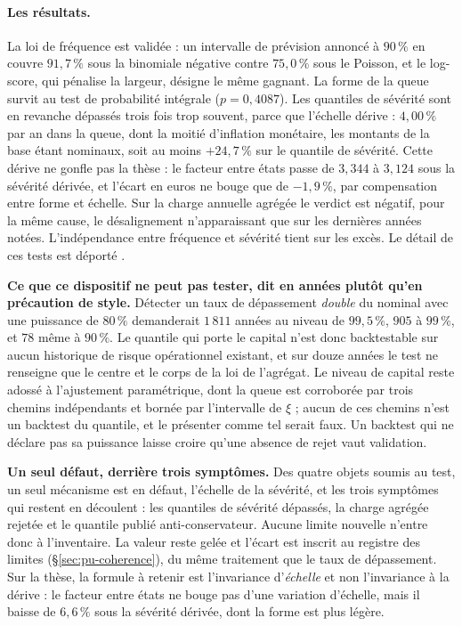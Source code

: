 \paragraph{Les résultats.} La loi de fréquence est validée : un intervalle de prévision annoncé à
$90\,\%$ en couvre $91{,}7\,\%$ sous la binomiale négative contre $75{,}0\,\%$ sous le Poisson,
et le log-score, qui pénalise la largeur, désigne le même gagnant. La forme de la queue survit au
test de probabilité intégrale ($p=0{,}4087$). Les quantiles de sévérité sont en revanche dépassés
trois fois trop souvent, parce que l'échelle dérive : $4{,}00\,\%$ par an dans la queue, dont la
moitié d'inflation monétaire, les montants de la base étant nominaux, soit au moins
$+24{,}7\,\%$ sur le quantile de sévérité. Cette dérive ne gonfle pas la thèse : le facteur entre
états passe de $3{,}344$ à $3{,}124$ sous la sévérité dérivée, et l'écart en euros ne bouge que
de $-1{,}9\,\%$, par compensation entre forme et échelle. Sur la charge annuelle agrégée le
verdict est négatif, pour la même cause, le désalignement n'apparaissant que sur les dernières
années notées. L'indépendance entre fréquence et sévérité tient sur les excès. Le détail de ces
tests est déporté \matcomp.

\begin{attention}
\textbf{Ce que ce dispositif ne peut pas tester, dit en années plutôt qu'en précaution de style.}
Détecter un taux de dépassement \emph{double} du nominal avec une puissance de $80\,\%$
demanderait $1\,811$ années au niveau de $99{,}5\,\%$, $905$ à $99\,\%$, et $78$ même à
$90\,\%$. Le quantile qui porte le capital n'est donc backtestable sur aucun historique
de risque opérationnel existant, et sur douze années le test ne renseigne que le centre et le
corps de la loi de l'agrégat. Le niveau de capital reste adossé à l'ajustement paramétrique,
dont la queue est corroborée par trois chemins indépendants et bornée par l'intervalle de
$\xi$ ; aucun de ces chemins n'est un backtest du quantile, et le présenter comme tel serait
faux. Un backtest qui ne déclare pas sa puissance laisse croire qu'une absence de rejet vaut
validation.
\end{attention}

\begin{cle}
\textbf{Un seul défaut, derrière trois symptômes.} Des quatre objets soumis au test, un seul
mécanisme est en défaut, l'échelle de la sévérité, et les trois symptômes qui restent en
découlent : les quantiles de sévérité dépassés, la charge agrégée rejetée et le quantile publié
anti-conservateur. Aucune limite nouvelle n'entre donc à l'inventaire. La valeur reste
gelée et l'écart est inscrit au registre des limites (\S\ref{sec:pu-coherence}), du même
traitement que le taux de dépassement. Sur la thèse, la formule à retenir est
l'invariance d'\emph{échelle} et non l'invariance à la dérive : le facteur entre états ne bouge
pas d'une variation d'échelle, mais il baisse de $6{,}6\,\%$ sous la sévérité dérivée, dont la
forme est plus légère.
\end{cle}

